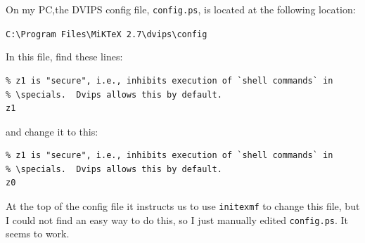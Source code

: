 On my PC,the DVIPS config file, \verb"config.ps", is located at the following location:

\verb+C:\Program Files\MiKTeX 2.7\dvips\config+

In this file, find these lines:

\begin{verbatim}
% z1 is "secure", i.e., inhibits execution of `shell commands` in
% \specials.  Dvips allows this by default.
z1
\end{verbatim}

and change it to this:

\begin{verbatim}
% z1 is "secure", i.e., inhibits execution of `shell commands` in
% \specials.  Dvips allows this by default.
z0
\end{verbatim}

At the top of the config file it instructs us to use \verb"initexmf" to change this file, but I could not find an easy way to do this, so I just manually edited \verb"config.ps".  It seems to work.



